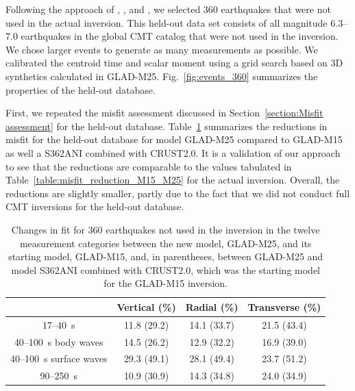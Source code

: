 Following the approach of \cite{tape2009adjoint}, \cite{chen2015multiparameter},
and \cite{bozdaug2016global}, we selected 360 earthquakes that were not used
in the actual inversion. This held-out data set consists of all magnitude 6.3--7.0
earthquakes in the global CMT catalog that were not used in the inversion.
We chose larger events to generate as many measurements as possible.
We calibrated the centroid time and scalar moment using a grid search based on
3D synthetics calculated in GLAD-M25.
Fig.~\ref{fig:events_360} summarizes the properties of the held-out database.

First, we repeated the misfit assessment discussed in
Section~\ref{section:Misfit assessment} for the held-out database.
Table~\ref{table:misfit_reduction_M15_M25_360} summarizes the reductions
in misfit for the held-out database for model GLAD-M25 compared to GLAD-M15
as well a S362ANI combined with CRUST2.0.
It is a validation of our approach to see that the reductions are comparable to the
values tabulated in Table~\ref{table:misfit_reduction_M15_M25} for the actual inversion.
Overall, the reductions are slightly smaller, partly due to the fact that we did not
conduct full CMT inversions for the held-out database.

\begin{table}
  \centering
  \begin{tabular}{|c|c|c|c|}
  \hline
  ~          &  Vertical (\%) & Radial (\%) &  Transverse (\%) \\
  \hline
  17--40~s                &          11.8 (29.2) &       14.1 (33.7) &       21.5 (43.4) \\
  40--100~s body waves    &          14.5 (26.2) &       12.9 (32.2)  &       16.9 (39.0) \\
  40--100~s surface waves &          29.3 (49.1) &       28.1 (49.4) &       23.7 (51.2) \\
  90--250~s               &          10.9 (30.9) &       14.3 (34.8)  &       24.0 (34.9) \\
  \hline
  \end{tabular}\\
  \caption{\small{Changes in fit for 360 earthquakes not used in the inversion in the twelve measurement categories
between the new model, GLAD-M25, and its starting model, GLAD-M15, and, in parentheses, between GLAD-M25 and model S362ANI combined with CRUST2.0, which was the starting model for the GLAD-M15 inversion.}}
  \label{table:misfit_reduction_M15_M25_360}
\end{table}


